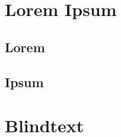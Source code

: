 \section{Lorem Ipsum}
\subsection{Lorem}
	\lipsum[1-2]
\subsection{Ipsum}
	\lipsum[4]
\section{Blindtext}
	\blinditemize[5]
	\blindmathpaper
	